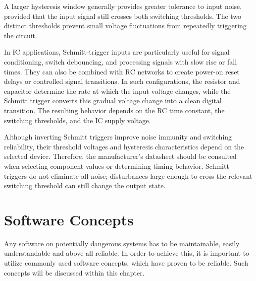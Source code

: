 \documentclass[fontsize=11pt,%
twoside,%
BCOR          = 8mm, %
DIV           = 11,  %
titlepage     = off,%
index=totoc,%
xcolor        = pdftex,%
dvipsnames,%
bibliography  = totoc,%
bibliography = numbered, %
listof        = notnumbered]{scrreprt}
\begin{document}
A larger hysteresis window generally provides greater tolerance to input noise, provided that the input signal still crosses both switching thresholds. The two distinct thresholds prevent small voltage fluctuations from repeatedly triggering the circuit.

In IC applications, Schmitt-trigger inputs are particularly useful for signal conditioning, switch debouncing, and processing signals with slow rise or fall times. They can also be combined with RC networks to create power-on reset delays or controlled signal transitions. In such configurations, the resistor and capacitor determine the rate at which the input voltage changes, while the Schmitt trigger converts this gradual voltage change into a clean digital transition. The resulting behavior depends on the RC time constant, the switching thresholds, and the IC supply voltage.

Although inverting Schmitt triggers improve noise immunity and switching reliability, their threshold voltages and hysteresis characteristics depend on the selected device. Therefore, the manufacturer's datasheet should be consulted when selecting component values or determining timing behavior. Schmitt triggers do not eliminate all noise; disturbances large enough to cross the relevant switching threshold can still change the output state.



\section{Software Concepts} 
Any software on potentially dangerous systems has to be maintainable, easily understandable and above all reliable. In order to achieve this, it is important to utilize commonly used software concepts, which have proven to be reliable. Such concepts will be discussed within this chapter.
\end{document}
